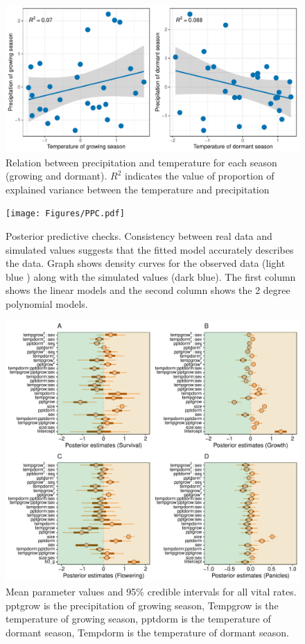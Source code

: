 \documentclass[12pt]{article}
\begin{document}
\begin{figure}[H]
		\centering
		\includegraphics[width=0.95\linewidth]{Figures/Varianceexplained.pdf}
		\caption{Relation between precipitation and temperature for each season (growing and dormant). $R^2$ indicates the value of proportion of explained variance between the temperature and precipitation}
		\label{Sup:Correlation}
\end{figure}
	
\begin{figure}[H]
		\centering
		\texttt{[image: Figures/PPC.pdf]}
		\caption{Posterior predictive checks. Consistency between real data and simulated values suggests that the fitted model accurately describes the data. Graph shows density curves for the observed data (light blue ) along with the simulated values (dark blue). The first column shows the linear models and the second column shows the 2 degree polynomial models.}
		\label{Sup:PPC}
	\end{figure}
	
\begin{figure}[H]
		\centering
		\includegraphics[width=0.95\linewidth]{Figures/Posterior_mean.pdf}
		\caption{Mean parameter values and 95\% credible intervals for all vital rates. 
		pptgrow is  the precipitation of growing season,
		Tempgrow is the temperature of growing season,
		pptdorm is the temperature of dormant season,
		Tempdorm is the temperature of dormant season.}
		\label{Sup:Posterior}
\end{figure}
\end{document}

